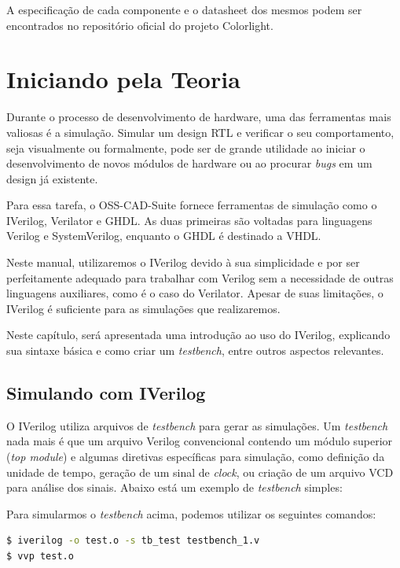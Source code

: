 \documentclass{report}
\begin{document}
A especificação de cada componente e o datasheet dos mesmos podem ser encontrados no repositório oficial do projeto Colorlight.


\chapter{Iniciando pela Teoria}

Durante o processo de desenvolvimento de hardware, uma das ferramentas mais valiosas é a simulação. Simular um design RTL e verificar o seu comportamento, seja visualmente ou formalmente, pode ser de grande utilidade ao iniciar o desenvolvimento de novos módulos de hardware ou ao procurar \textit{bugs} em um design já existente.

Para essa tarefa, o OSS-CAD-Suite fornece ferramentas de simulação como o IVerilog, Verilator e GHDL. As duas primeiras são voltadas para linguagens Verilog e SystemVerilog, enquanto o GHDL é destinado a VHDL.

Neste manual, utilizaremos o IVerilog devido à sua simplicidade e por ser perfeitamente adequado para trabalhar com Verilog sem a necessidade de outras linguagens auxiliares, como é o caso do Verilator. Apesar de suas limitações, o IVerilog é suficiente para as simulações que realizaremos.

Neste capítulo, será apresentada uma introdução ao uso do IVerilog, explicando sua sintaxe básica e como criar um \textit{testbench}, entre outros aspectos relevantes.

\section{Simulando com IVerilog}

O IVerilog utiliza arquivos de \textit{testbench} para gerar as simulações. Um \textit{testbench} nada mais é que um arquivo Verilog convencional contendo um módulo superior (\textit{top module}) e algumas diretivas específicas para simulação, como definição da unidade de tempo, geração de um sinal de \textit{clock}, ou criação de um arquivo VCD para análise dos sinais. Abaixo está um exemplo de \textit{testbench} simples:



Para simularmos o \textit{testbench} acima, podemos utilizar os seguintes comandos:

\begin{lstlisting}[language=bash]
$ iverilog -o test.o -s tb_test testbench_1.v
$ vvp test.o
\end{lstlisting}
\end{document}
